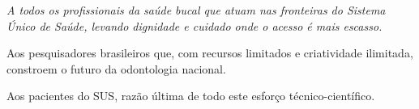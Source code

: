 \newpage
\thispagestyle{empty}
\vspace*{\fill}
\begin{flushright}
\begin{minipage}{0.6\textwidth}
\itshape\Large
A todos os profissionais da saúde bucal que atuam nas fronteiras do Sistema Único de Saúde, levando dignidade e cuidado onde o acesso é mais escasso.

\vspace{1cm}
Aos pesquisadores brasileiros que, com recursos limitados e criatividade ilimitada, constroem o futuro da odontologia nacional.

\vspace{1cm}
Aos pacientes do SUS, razão última de todo este esforço técnico-científico.
\end{minipage}
\end{flushright}
\vspace*{\fill}
